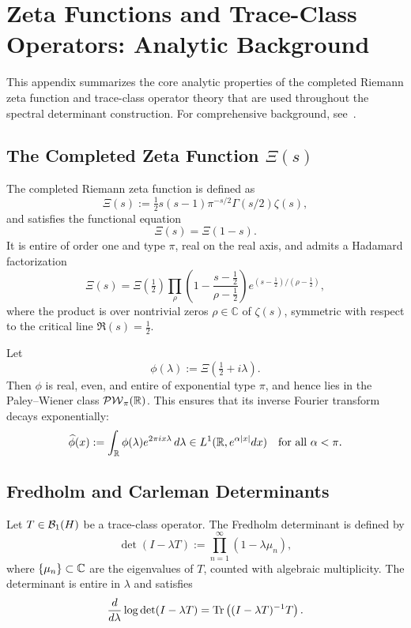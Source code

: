 \section{Zeta Functions and Trace-Class Operators: Analytic Background}
\label{app:zeta_trace_background}

This appendix summarizes the core analytic properties of the completed Riemann zeta function and trace-class operator theory that are used throughout the spectral determinant construction. For comprehensive background, see~\cite{Titchmarsh1986Zeta, Simon2005TraceIdeals, Bornemann2010FredholmDeterminants}.

\subsection*{The Completed Zeta Function \( \Xi(s) \)}

The completed Riemann zeta function is defined as
\[
\Xi(s) := \tfrac{1}{2}s(s-1)\pi^{-s/2}\Gamma(s/2)\zeta(s),
\]
and satisfies the functional equation
\[
\Xi(s) = \Xi(1 - s).
\]
It is entire of order one and type \( \pi \), real on the real axis, and admits a Hadamard factorization
\[
\Xi(s) = \Xi(\tfrac{1}{2}) \prod_{\rho} \left(1 - \frac{s - \tfrac{1}{2}}{\rho - \tfrac{1}{2}}\right) e^{(s - \tfrac{1}{2})/(\rho - \tfrac{1}{2})},
\]
where the product is over nontrivial zeros \( \rho \in \mathbb{C} \) of \( \zeta(s) \), symmetric with respect to the critical line \( \Re(s) = \tfrac{1}{2} \).

Let
\[
\phi(\lambda) := \Xi\left(\tfrac{1}{2} + i\lambda\right).
\]
Then \( \phi \) is real, even, and entire of exponential type \( \pi \), and hence lies in the Paley–Wiener class \( \mathcal{PW}_{\pi}(\mathbb{R}) \). This ensures that its inverse Fourier transform decays exponentially:
\[
\widehat{\phi}(x) := \int_{\mathbb{R}} \phi(\lambda)e^{2\pi i x \lambda} \, d\lambda
\in L^1(\mathbb{R}, e^{\alpha|x|}dx) \quad \text{for all } \alpha < \pi.
\]

\subsection*{Fredholm and Carleman Determinants}

Let \( T \in \mathcal{B}_1(H) \) be a trace-class operator. The Fredholm determinant is defined by
\[
\det(I - \lambda T) := \prod_{n=1}^\infty (1 - \lambda \mu_n),
\]
where \( \{ \mu_n \} \subset \mathbb{C} \) are the eigenvalues of \( T \), counted with algebraic multiplicity. The determinant is entire in \( \lambda \) and satisfies
\[
\frac{d}{d\lambda} \log \det(I - \lambda T) = \operatorname{Tr}\left((I - \lambda T)^{-1}T\right).
\]


